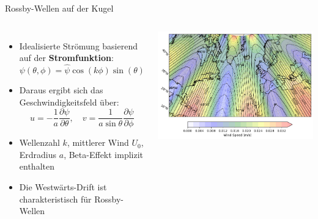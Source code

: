 
\begin{frame}{Rossby-Wellen auf der Kugel}
    \begin{columns}
      \begin{itemize}
        \item Idealisierte Strömung basierend auf der \textbf{Stromfunktion}:
        \[
          \psi(\theta, \phi) = \hat{\psi} \cos(k \phi) \sin(\theta)
        \]
        \item Daraus ergibt sich das Geschwindigkeitsfeld über:
        \[
          u = -\frac{1}{a} \frac{\partial \psi}{\partial \theta}, \quad
          v = \frac{1}{a \sin \theta} \frac{\partial \psi}{\partial \phi}
        \]
        \item Wellenzahl \( k \), mittlerer Wind \( U_0 \), \\
              Erdradius \( a \), Beta-Effekt implizit enthalten
        \item Die Westwärts-Drift ist charakteristisch für Rossby-Wellen
      \end{itemize}
  
      \centering
      \includegraphics[width=\linewidth]{../images/rossby_wave_plot.png}
    \end{columns}
  \end{frame}
  

